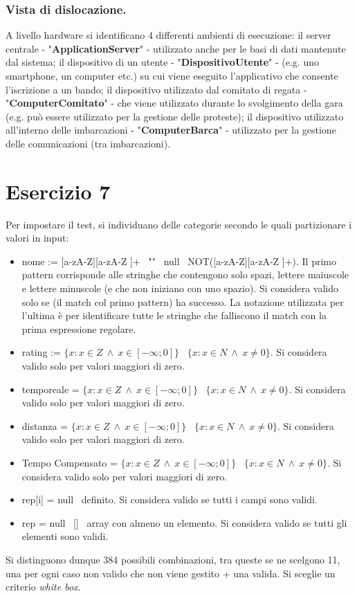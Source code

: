 \documentclass[10pt, openany, landscape]{book}
\begin{document}
\subsubsection*{Vista di dislocazione.}
A livello hardware si identificano 4 differenti ambienti di esecuzione: il server centrale - "\textbf{ApplicationServer}" -
utilizzato anche per le basi di dati mantenute dal sistema; il dispositivo di un utente - "\textbf{DispositivoUtente}" -
(e.g. uno smartphone, un computer etc.) su cui viene eseguito l'applicativo che consente l'iscrizione a un bando; il dispositivo
utilizzato dal comitato di regata - "\textbf{ComputerComitato}" - che viene utilizzato durante lo svolgimento della gara (e.g. pu\`o
essere utilizzato per la gestione delle proteste); il dispositivo utilizzato all'interno delle imbarcazioni -
"\textbf{ComputerBarca}" - utilizzato per la gestione delle comunicazioni (tra imbarcazioni).

\pagebreak

\section{Esercizio 7}
Per impostare il test, si individuano delle categorie secondo le quali partizionare i valori in input:
\begin{itemize}
\itemsep0em
    \item nome := [a-zA-Z][a-zA-Z ]+ \textbar \ "" \textbar \ null \textbar \ NOT([a-zA-Z][a-zA-Z ]+). Il primo pattern corrisponde alle stringhe che contengono solo spazi, lettere maiuscole e lettere minuscole (e che non iniziano con uno spazio). Si considera valido solo se (il match col primo pattern) ha successo. La notazione utilizzata per l'ultima \`e per identificare tutte le stringhe che falliscono il match con la prima espressione regolare.
    \item rating := \(\{x : x \in Z \ \wedge \ x \in [-\infty; 0]\} \) \textbar \ \(\{x : x \in N \ \wedge \ x \neq 0\} \). Si considera valido solo per valori maggiori di zero.
    \item temporeale = \(\{x : x \in Z \ \wedge \ x \in [-\infty; 0]\} \) \textbar \ \(\{x : x \in N \ \wedge \ x \neq 0\} \). Si considera valido solo per valori maggiori di zero.
    \item distanza = \(\{x : x \in Z \ \wedge \ x \in [-\infty; 0]\} \) \textbar \ \(\{x : x \in N \ \wedge \ x \neq 0\} \). Si considera valido solo per valori maggiori di zero.
    \item Tempo Compensato = \(\{x : x \in Z \ \wedge \ x \in [-\infty; 0]\} \) \textbar \ \(\{x : x \in N \ \wedge \ x \neq 0\} \). Si considera valido solo per valori maggiori di zero.
    \item rep[i] = null \textbar \ definito. Si considera valido se tutti i campi sono validi.
    \item rep = null \textbar \  [] \textbar \ array con almeno un elemento. Si considera valido se tutti gli elementi sono validi.
\end{itemize}
Si distinguono dunque 384 possibili combinazioni, tra queste se ne scelgono 11, una per ogni caso non valido che non viene
gestito + una valida. Si sceglie un criterio \textit{white box}.
\end{document}

